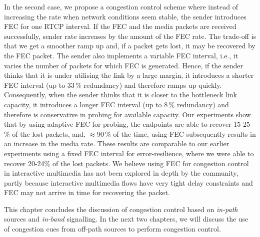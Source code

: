 In the second case, we propose a congestion control scheme where instead of
increasing the rate when network conditions seem stable, the sender introduces
FEC for one RTCP interval. If the FEC and the media packets are received
successfully, sender rate increases by the amount of the FEC rate. 
The trade-off is that we get a smoother ramp up and, if a packet gets
lost, it may be recovered by the FEC packet. The sender also implements a
variable FEC interval, i.e., it varies the number of packets for which FEC is
generated. Hence, if the sender thinks that it is under utilising the link by a
large margin, it introduces a shorter FEC interval (up to 33\,\% redundancy)
and therefore ramps up quickly. Consequently, when the sender thinks that it is closer
to the bottleneck link capacity, it introduces a longer FEC interval (up to
8\,\% redundancy) and therefore is conservative in probing for available
capacity. Our experiments show that by using adaptive FEC for probing, the
endpoints are able to recover 15-25\,\% of the lost packets, and,
$\approx$90\,\% of the time, using FEC subsequently results in an increase in
the media rate. These results are comparable to our earlier experiments using
a fixed FEC interval for error-resilience, where we were able to recover
20-24\;\% of the lost packets. We believe using FEC for congestion control in
interactive multimedia has not been explored in depth by the community, partly
because interactive multimedia flows have very tight delay constraints and FEC
may not arrive in time for recovering the packet.

This chapter concludes the discussion of congestion control based on 
\emph{in-path} sources and \emph{in-band} signalling. In the next two chapters, we will
discuss the use of congestion cues from off-path sources to perform congestion
control.
